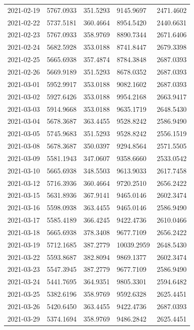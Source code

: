 \begin{footnotesize}
\begin{longtable}{lllll}
2021-02-19 & 5767.0933 & 351.5293 & 9145.9697 & 2471.4602 \\
2021-02-22 & 5737.5181 & 360.4664 & 8954.5420 & 2440.6631 \\
2021-02-23 & 5767.0933 & 358.9769 & 8890.7344 & 2671.6406 \\
2021-02-24 & 5682.5928 & 353.0188 & 8741.8447 & 2679.3398 \\
2021-02-25 & 5665.6938 & 357.4874 & 8784.3848 & 2687.0393 \\
2021-02-26 & 5669.9189 & 351.5293 & 8678.0352 & 2687.0393 \\
2021-03-01 & 5952.9917 & 353.0188 & 9082.1602 & 2687.0393 \\
2021-03-02 & 5927.6426 & 353.0188 & 9954.2168 & 2663.9417 \\
2021-03-03 & 5914.9668 & 353.0188 & 9635.1719 & 2648.5430 \\
2021-03-04 & 5678.3687 & 363.4455 & 9528.8242 & 2586.9490 \\
2021-03-05 & 5745.9683 & 351.5293 & 9528.8242 & 2556.1519 \\
2021-03-08 & 5678.3687 & 350.0397 & 9294.8564 & 2571.5505 \\
2021-03-09 & 5581.1943 & 347.0607 & 9358.6660 & 2533.0542 \\
2021-03-10 & 5665.6938 & 348.5503 & 9613.9033 & 2617.7458 \\
2021-03-12 & 5716.3936 & 360.4664 & 9720.2510 & 2656.2422 \\
2021-03-15 & 5631.8936 & 367.9141 & 9465.0146 & 2602.3474 \\
2021-03-16 & 5598.0938 & 363.4455 & 9465.0146 & 2586.9490 \\
2021-03-17 & 5585.4189 & 366.4245 & 9422.4736 & 2610.0466 \\
2021-03-18 & 5665.6938 & 378.3408 & 9677.7109 & 2656.2422 \\
2021-03-19 & 5712.1685 & 387.2779 & 10039.2959 & 2648.5430 \\
2021-03-22 & 5593.8687 & 382.8094 & 9869.1377 & 2602.3474 \\
2021-03-23 & 5547.3945 & 387.2779 & 9677.7109 & 2586.9490 \\
2021-03-24 & 5441.7695 & 364.9351 & 9805.3301 & 2594.6482 \\
2021-03-25 & 5382.6196 & 358.9769 & 9592.6328 & 2625.4451 \\
2021-03-26 & 5420.6450 & 363.4455 & 9422.4736 & 2687.0393 \\
2021-03-29 & 5374.1694 & 358.9769 & 9486.2842 & 2625.4451 \\

\end{longtable}
\end{footnotesize}
